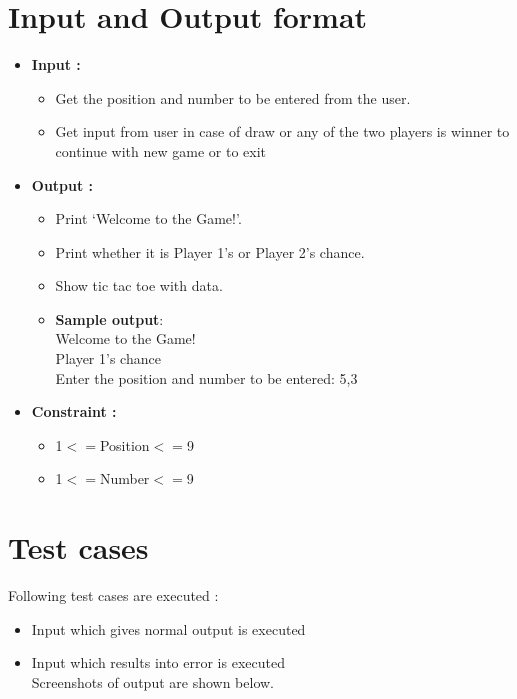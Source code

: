 \documentclass[11pt,oneside]{book}
\begin{document}
\section{Input and Output format}
\begin{itemize}
    \item \textbf{Input : }
        \begin{itemize}
            \item Get the position and number to be entered from the user.
            \item Get input from user in case of draw or any of the two players is winner to continue with new game or to exit

        \end{itemize}
    \item \textbf{Output : }
        \begin{itemize}
            \item Print ‘Welcome to the Game!’.	
            \item Print whether it is Player 1’s or Player 2’s chance.
            \item Show tic tac toe with data.
            \item \textbf{Sample output}:\\
            Welcome to the Game!\\
            Player 1’s chance\\
            Enter the position and number to be entered: 5,3\\
        \end{itemize}
    \item \textbf{Constraint :}
        \begin{itemize}
            \item 1$<=$Position$<=$9
            \item 1$<=$Number$<=$9
        \end{itemize}
        
\end{itemize}

\section{Test cases}
Following test cases are executed :
\begin{itemize}
    \item Input which gives normal output is executed
    \item Input which results into error is executed\\
Screenshots of output are shown below.
\end{itemize}
\end{document}
